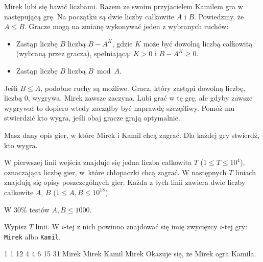 

\usepackage[utf8]{inputenc}
\usepackage[T1]{fontenc}
\usepackage[polish]{babel}
\usepackage{polski}





Mirek lubi się bawić liczbami.
Razem ze swoim przyjacielem Kamilem gra w następującą grę.
Na początku są dwie liczby całkowite $A$ i $B$.
Powiedzmy, że $A \le B$.
Gracze mogą na zmianę wykonywać jeden z wybranych ruchów:
\begin{itemize}
	\item Zastąp liczbę $B$ liczbą $B - A^K$, gdzie $K$ może być dowolną liczbą całkowitą (wybraną przez gracza),
		spełniającą: $K > 0$ i $B - A^K \ge 0$.
	\item Zastąp liczbę $B$ liczbą $B \bmod A$.
\end{itemize}

Jeśli $B \le A$, podobne ruchy są możliwe.
Gracz, który zastąpi dowolną liczbę, liczbą $0$, wygrywa.
Mirek zawsze zaczyna.
Lubi grać w tę grę, ale gdyby zawsze wygrywał to dopiero wtedy zacząłby być naprawdę szczęśliwy.
Pomóż mu stwierdzić kto wygra, jeśli obaj gracze grają optymalnie.


Masz dany opis gier, w które Mirek i Kamil chcą zagrać.
Dla każdej gry stwierdź, kto wygra.


W pierwszej linii wejścia znajduje się jedna liczba całkowita $T$ ($1 \le T \le 10^4$),
	oznaczająca liczbę gier, w~które chłopaczki chcą zagrać.
W następnych $T$ liniach znajdują się opisy poszczególnych gier.
Każda z tych linii zawiera dwie liczby całkowite $A$, $B$ ($1 \le A, B \le 10^{18}$).

W $30\%$ testów $A, B \le 1000$.


Wypisz $T$ linii.
W $i$-tej z nich powinno znajdować się imię zwycięzcy $i$-tej gry: \texttt{Mirek} albo \texttt{Kamil}.


1 1
12 4
4 6
15 31
\sampleOUT
Mirek
Mirek
Kamil
Mirek
\sampleCOMMENT
Okazuje się, że Mirek ogra Kamila.
\sampleEND


